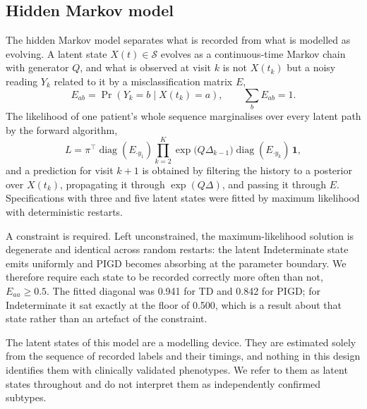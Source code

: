 \documentclass[11pt]{article}
\begin{document}
\subsection{Hidden Markov model}
\label{sec:hmm}
The hidden Markov model separates what is recorded from what is modelled as
evolving. A latent state $X(t) \in \mathcal{S}$ evolves as a continuous-time
Markov chain with generator $Q$, and what is observed at visit $k$ is not
$X(t_k)$ but a noisy reading $Y_k$ related to it by a misclassification matrix
$E$,
\begin{equation}
E_{ab} = \Pr(Y_k = b \mid X(t_k) = a), \qquad \sum_b E_{ab} = 1 .
\label{eq:emission}
\end{equation}
The likelihood of one patient's whole sequence marginalises over every latent
path by the forward algorithm,
\begin{equation}
L = \pi^{\!\top} \! \operatorname{diag}(E_{\cdot y_1})
    \prod_{k=2}^{K} \exp\!\bigl(Q \Delta_{k-1}\bigr)
    \operatorname{diag}(E_{\cdot y_k})\, \mathbf{1},
\label{eq:forward}
\end{equation}
and a prediction for visit $k+1$ is obtained by filtering the history to a
posterior over $X(t_k)$, propagating it through $\exp(Q\Delta)$, and passing it
through $E$. Specifications with three and five latent states were fitted by
maximum likelihood with deterministic restarts.

A constraint is required. Left unconstrained, the maximum-likelihood solution is
degenerate and identical across random restarts: the latent Indeterminate state
emits uniformly and PIGD becomes absorbing at the parameter boundary. We
therefore require each state to be recorded correctly more often than not,
$E_{aa} \geq 0.5$. The fitted diagonal was 0.941 for TD and 0.842 for PIGD; for
Indeterminate it sat exactly at the floor of 0.500, which is a result about that
state rather than an artefact of the constraint.

The latent states of this model are a modelling device. They are estimated
solely from the sequence of recorded labels and their timings, and nothing in
this design identifies them with clinically validated phenotypes. We refer to
them as latent states throughout and do not interpret them as independently
confirmed subtypes.
\end{document}
